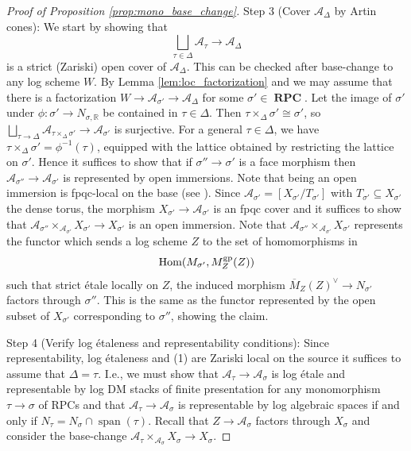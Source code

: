 \documentclass[11pt]{amsart}
\theoremstyle{definition}
\theoremstyle{remark}
\DeclareMathOperator{\Span}{span}
\def\gp{\mathrm{gp}}
\DeclareMathOperator{\RPC}{\mathbf{RPC}}
\DeclareMathOperator{\Hom}{\textup{Hom}}
\begin{document}
\begin{proof}[Proof of Proposition \ref{prop:mono_base_change}]
	Step 3 (Cover $\mathcal{A}_{\Delta}$ by Artin cones): We start by showing that
	$$\bigsqcup_{\tau\in \Delta}\mathcal{A}_{\tau}\to \mathcal{A}_{\Delta}$$
	is a strict (Zariski) open cover of $\mathcal{A}_{\Delta}$.
	This can be checked after base-change to any log scheme $W$. By Lemma \ref{lem:loc_factorization} and \cite[Tag 02L3]{stacks-project}
	we may assume that there is
	a factorization $W\to \mathcal{A}_{\sigma'}\to \mathcal{A}_{\Delta}$ for some $\sigma'\in \RPC$. Let the image of $\sigma'$
	under $\phi:\sigma'\to N_{\sigma,\mathbb{R}}$ be contained in $\tau\in \Delta$. Then $\tau\times_{\Delta}\sigma'\cong \sigma'$, so $\bigsqcup_{\tau\to \Delta}\mathcal{A}_{\tau\times_{\Delta}\sigma'}\to \mathcal{A}_{\sigma'}$
	is surjective. For a general $\tau\in \Delta$, we have $\tau\times_{\Delta}\sigma'=\phi^{-1}(\tau)$, equipped with the lattice
	obtained by restricting the lattice on $\sigma'$. Hence it suffices to show that if $\sigma''\to \sigma'$ is a face morphism then $\mathcal{A}_{\sigma''}\to \mathcal{A}_{\sigma'}$
	is represented by open immersions. Note that being an open immersion is fpqc-local on the base (see \cite[Tag 02L3]{stacks-project}).
	Since $\mathcal{A}_{\sigma'}=[X_{\sigma'}/T_{\sigma'}]$ with $T_{\sigma'}\subseteq X_{\sigma'}$ the dense torus, the morphism
	$X_{\sigma'}\to \mathcal{A}_{\sigma'}$ is an fpqc cover and it suffices to show that
	$\mathcal{A}_{\sigma''}\times_{\mathcal{A}_{\sigma'}}X_{\sigma'}\to X_{\sigma'}$ is an open immersion. Note that
	$\mathcal{A}_{\sigma''}\times_{\mathcal{A}_{\sigma'}}X_{\sigma'}$ represents the functor which sends a log scheme $Z$
	to the set of homomorphisms in
	$$\Hom(M_{\sigma'},M_Z^{\gp}(Z))$$
	such that strict étale locally on $Z$, the induced
	morphism $\overline{M}_Z(Z)^{\vee}\to N_{\sigma'}$ factors through $\sigma''$. This is the same as the functor represented
	by the open subset of $X_{\sigma'}$ corresponding to $\sigma''$, showing the claim.

	Step 4 (Verify log étaleness and representability conditions): Since representability, log étaleness and (1) are Zariski local on the source it suffices to assume that $\Delta=\tau$. I.e.,
	we must show that $\mathcal{A}_{\tau}\to \mathcal{A}_{\sigma}$ is log étale and representable by log DM stacks of finite presentation for any
	monomorphism $\tau\to \sigma$ of RPCs and that $\mathcal{A}_{\tau}\to \mathcal{A}_{\sigma}$ is representable by
	log algebraic spaces if and only if $N_{\tau}=N_{\sigma}\cap \Span(\tau)$. Recall that $Z\to \mathcal{A}_{\sigma}$ factors through $X_{\sigma}$
	and consider the base-change $\mathcal{A}_{\tau}\times_{\mathcal{A}_{\sigma}}X_{\sigma}\to X_{\sigma}$.


\end{proof}
\end{document}
